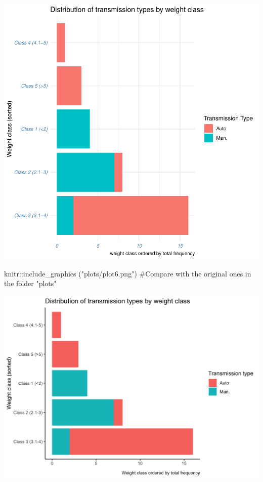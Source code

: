 \documentclass[
  man,
  floatsintext,
  longtable,
  nolmodern,
  notxfonts,
  notimes,
  colorlinks=true,linkcolor=blue,citecolor=blue,urlcolor=blue]{apa7}
\newenvironment{Shaded}{\begin{snugshade}}{\end{snugshade}}
\newcommand{\CommentTok}[1]{\textcolor[rgb]{0.37,0.37,0.37}{#1}}
\newcommand{\FunctionTok}[1]{\textcolor[rgb]{0.28,0.35,0.67}{#1}}
\newcommand{\NormalTok}[1]{\textcolor[rgb]{0.00,0.23,0.31}{#1}}
\newcommand{\SpecialCharTok}[1]{\textcolor[rgb]{0.37,0.37,0.37}{#1}}
\newcommand{\StringTok}[1]{\textcolor[rgb]{0.13,0.47,0.30}{#1}}
\begin{document}
\includegraphics{data-visualization_files/figure-pdf/Compare resultsusing include_graphics()-1.pdf}

\begin{Shaded}
\begin{Highlighting}[]
\NormalTok{knitr}\SpecialCharTok{::}\FunctionTok{include\_graphics}\NormalTok{ (}\StringTok{"plots/plot6.png"}\NormalTok{) }\CommentTok{\#Compare with the original ones in the folder "plots"}
\end{Highlighting}
\end{Shaded}

\includegraphics{plots/plot6.png}
\end{document}
